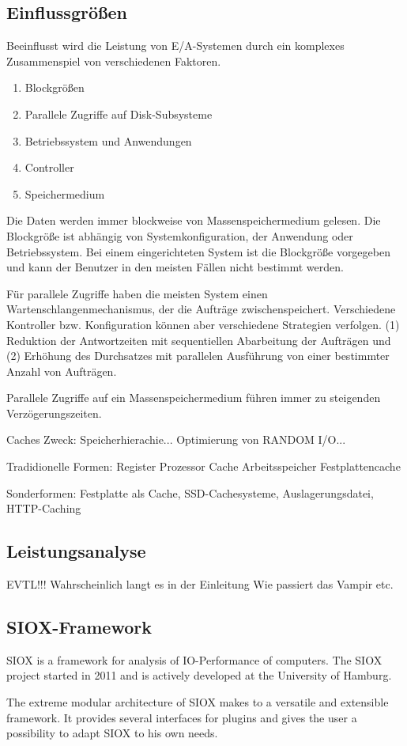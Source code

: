 \subsection{Einflussgrößen}
Beeinflusst wird die Leistung von E/A-Systemen durch ein komplexes Zusammenspiel von verschiedenen Faktoren.

\begin{enumerate}
	\item Blockgrößen
	\item Parallele Zugriffe auf Disk-Subsysteme
	\item Betriebssystem und Anwendungen
	\item Controller
	\item Speichermedium
\end{enumerate}

Die Daten werden immer blockweise von Massenspeichermedium gelesen. Die Blockgröße ist abhängig von Systemkonfiguration, der Anwendung oder Betriebssystem. Bei einem eingerichteten System ist die Blockgröße vorgegeben und kann der Benutzer in den meisten Fällen nicht bestimmt werden. 

Für parallele Zugriffe haben die meisten System einen Wartenschlangenmechanismus, der die Aufträge zwischenspeichert. Verschiedene Kontroller bzw. Konfiguration können aber verschiedene Strategien verfolgen. (1) Reduktion der Antwortzeiten mit sequentiellen Abarbeitung der Aufträgen und (2) Erhöhung des Durchsatzes mit parallelen Ausführung von einer bestimmter Anzahl von Aufträgen.

Parallele Zugriffe auf ein Massenspeichermedium führen immer zu steigenden Verzögerungszeiten.

Caches
Zweck: Speicherhierachie... Optimierung von RANDOM I/O...

Tradidionelle Formen:
Register
Prozessor Cache
Arbeitsspeicher
Festplattencache

Sonderformen: Festplatte als Cache, SSD-Cachesysteme, Auslagerungsdatei, HTTP-Caching


\subsection{Leistungsanalyse}
EVTL!!! Wahrscheinlich langt es in der Einleitung
Wie passiert das Vampir etc.




\subsection{SIOX-Framework}

SIOX is a framework for analysis of IO-Performance of computers. The SIOX project started in 2011 and is actively developed at the University of Hamburg. 

The extreme modular architecture of SIOX makes to a versatile and extensible framework. It provides several interfaces for plugins and gives the user a possibility to adapt SIOX to his own needs.
